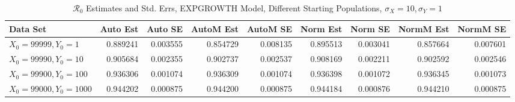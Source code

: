 \documentclass[12pt]{article}
\newcommand{\rr}{\ensuremath{\mathcal{R}_0}}
\begin{document}
\begin{table}[H]
	
	\caption{$\rr$ Estimates and Std. Errs, EXPGROWTH Model,
		Different Starting Populations, 
		$\sigma_X = 10, \sigma_Y = 1$}
	\begin{footnotesize}
		\hskip -1.7cm
		\begin{tabular}{l|r|r|r|r|r|r|r|r}
			\hline
			Data Set & Auto Est & Auto SE & AutoM Est & AutoM SE & Norm Est & Norm SE & NormM Est & NormM SE\\
			\hline
			$X_0 = 99999, Y_0 = 1$ & 0.889241 & 0.003555 & 0.854729 & 0.008135 & 0.895513 & 0.003041 & 0.857664 & 0.007601\\
			\hline
			$X_0 = 99990, Y_0 = 10$ & 0.905684 & 0.002355 & 0.902737 & 0.002537 & 0.908169 & 0.002211 & 0.902592 & 0.002546\\
			\hline
			$X_0 = 99900, Y_0 = 100$ & 0.936306 & 0.001074 & 0.936309 & 0.001074 & 0.936398 & 0.001072 & 0.936345 & 0.001073\\
			\hline
			$X_0 = 99000, Y_0 = 1000$ & 0.944202 & 0.000875 & 0.944200 & 0.000875 & 0.944184 & 0.000876 & 0.944210 & 0.000875\\
			\hline
		\end{tabular}
	\end{footnotesize}
\end{table}
\end{document}
